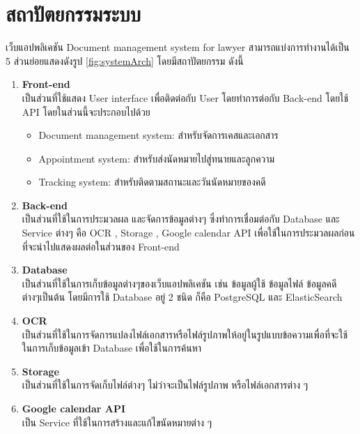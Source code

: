 \documentclass[12pt,oneside,openright,a4paper]{cpe-thai-project}
\begin{document}
\section{สถาปัตยกรรมระบบ}
\hspace*{1cm} เว็บแอปพลิเคชัน Document management system for lawyer สามารถแบ่งการทำงานได้เป็น 5 ส่วนย่อยแสดงดังรูป \ref{fig:systemArch} โดยมีสถาปัตยกรรม ดังนี้
\begin{enumerate}
  \item \textbf{Front-end} \\
  \hspace*{1cm} เป็นส่วนที่ใช้แสดง User interface เพื่อติดต่อกับ User โดยทำการต่อกับ Back-end โดยใช้ API โดยในส่วนนี้จะประกอบไปด้วย
  \begin{itemize}
    \item Document management system: สำหรับจัดการเคสและเอกสาร
    \item Appointment system: สำหรับส่งนัดหมายไปสู่ทนายและลูกความ
    \item Tracking system: สำหรับติดตามสถานะและวันนัดหมายของคดี
  \end{itemize}
  \item \textbf{Back-end} \\
  \hspace*{1cm} เป็นส่วนที่ใช้ในการประมวลผล และจัดการข้อมูลต่างๆ ซึ่งทำการเชื่อมต่อกับ Database และ Service ต่างๆ คือ OCR , Storage , Google calendar API เพื่อใช้ในการประมวลผลก่อนที่จะนำไปแสดงผลต่อในส่วนของ Front-end 
  \item \textbf{Database} \\
  \hspace*{1cm} เป็นส่วนที่ใช้ในการเก็บข้อมูลต่างๆของเว็บแอปพลิเคชัน เช่น ข้อมูลผู้ใช้ ข้อมูลไฟล์ ข้อมูลคดี ต่างๆเป็นต้น โดยมีการใช้ Database อยู่ 2 ชนิด ก็คือ PostgreSQL และ ElasticSearch 
  \item \textbf{OCR} \\
  \hspace*{1cm} เป็นส่วนที่ใช้ในการจัดการแปลงไฟล์เอกสารหรือไฟล์รูปภาพให้อยู่ในรูปแบบข้อความเพื่อที่จะใช้ในการเก็บข้อมูลเข้า Database เพื่อใช้ในการค้นหา
  \item \textbf{Storage} \\
  \hspace*{1cm} เป็นส่วนที่ใช้ในการจัดเก็บไฟล์ต่างๆ ไม่ว่าจะเป็นไฟล์รูปภาพ หรือไฟล์เอกสารต่าง ๆ 
  \item \textbf{Google calendar API} \\
  \hspace*{1cm} เป็น Service ที่ใช้ในการสร้างและแก้ไขนัดหมายต่าง ๆ
\end{enumerate}
\end{document}
